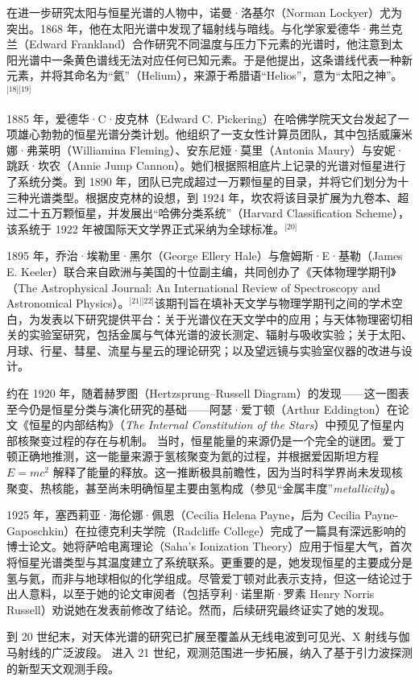 在进一步研究太阳与恒星光谱的人物中，诺曼·洛基尔（Norman Lockyer）尤为突出。1868 年，他在太阳光谱中发现了辐射线与暗线。与化学家爱德华·弗兰克兰（Edward Frankland）合作研究不同温度与压力下元素的光谱时，他注意到太阳光谱中一条黄色谱线无法对应任何已知元素。于是他提出，这条谱线代表一种新元素，并将其命名为“氦”（Helium），来源于希腊语“Helios”，意为“太阳之神”。\(^\text{[18][19]}\)

1885 年，爱德华·C·皮克林（Edward C. Pickering）在哈佛学院天文台发起了一项雄心勃勃的恒星光谱分类计划。他组织了一支女性计算员团队，其中包括威廉米娜·弗莱明（Williamina Fleming）、安东尼娅·莫里（Antonia Maury）与安妮·跳跃·坎农（Annie Jump Cannon）。她们根据照相底片上记录的光谱对恒星进行了系统分类。到 1890 年，团队已完成超过一万颗恒星的目录，并将它们划分为十三种光谱类型。根据皮克林的设想，到 1924 年，坎农将该目录扩展为九卷本、超过二十五万颗恒星，并发展出“哈佛分类系统”（Harvard Classification Scheme），该系统于 1922 年被国际天文学界正式采纳为全球标准。\(^\text{[20]}\)

1895 年，乔治·埃勒里·黑尔（George Ellery Hale）与詹姆斯·E·基勒（James E. Keeler）联合来自欧洲与美国的十位副主编，共同创办了《天体物理学期刊》（The Astrophysical Journal: An International Review of Spectroscopy and Astronomical Physics）。\(^\text{[21][22]}\)该期刊旨在填补天文学与物理学期刊之间的学术空白，为发表以下研究提供平台：关于光谱仪在天文学中的应用；与天体物理密切相关的实验室研究，包括金属与气体光谱的波长测定、辐射与吸收实验；关于太阳、月球、行星、彗星、流星与星云的理论研究；以及望远镜与实验室仪器的改进与设计。\cite{ref21}


约在 1920 年，随着赫罗图（Hertzsprung–Russell Diagram）的发现——这一图表至今仍是恒星分类与演化研究的基础——阿瑟·爱丁顿（Arthur Eddington）在论文《恒星的内部结构》（\textit{The Internal Constitution of the Stars}）中预见了恒星内部核聚变过程的存在与机制。\cite{ref23,ref24} 当时，恒星能量的来源仍是一个完全的谜团。爱丁顿正确地推测，这一能量来源于氢核聚变为氦的过程，并根据爱因斯坦方程 $E = mc^2$ 解释了能量的释放。这一推断极具前瞻性，因为当时科学界尚未发现核聚变、热核能，甚至尚未明确恒星主要由氢构成（参见“金属丰度”\textit{metallicity}）。\cite{ref25}

1925 年，塞西莉亚·海伦娜·佩恩（Cecilia Helena Payne，后为 Cecilia Payne-Gaposchkin）在拉德克利夫学院（Radcliffe College）完成了一篇具有深远影响的博士论文。她将萨哈电离理论（Saha’s Ionization Theory）应用于恒星大气，首次将恒星光谱类型与其温度建立了系统联系。\cite{ref26}更重要的是，她发现恒星的主要成分是氢与氦，而非与地球相似的化学组成。尽管爱丁顿对此表示支持，但这一结论过于出人意料，以至于她的论文审阅者（包括亨利·诺里斯·罗素 Henry Norris Russell）劝说她在发表前修改了结论。然而，后续研究最终证实了她的发现。\cite{ref27,ref28}

到 20 世纪末，对天体光谱的研究已扩展至覆盖从无线电波到可见光、X 射线与伽马射线的广泛波段。\cite{ref29}  
进入 21 世纪，观测范围进一步拓展，纳入了基于引力波探测的新型天文观测手段。
